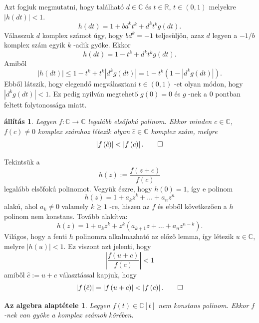 \documentclass[a4paper, showtrims]{memoir}
\makeatletter
\renewenvironment{proof}[1][\proofname]
    {\par\pushQED{\qed}%
    \normalfont \topsep6\p@\@plus6\p@\relax
    \trivlist
    \item[\hskip\labelsep
        \itshape
    #1\@addpunct{:}]\ignorespaces}
    {\popQED\endtrivlist\@endpefalse}
\theoremstyle{plain}
\newtheorem{proposition}{állítás}[chapter]
\newtheorem*{FA}{Az algebra alaptétele}
\theoremstyle{remark}
\theoremstyle{definition}
\makeatother
\begin{document}
\begin{proof}
	Azt fogjuk megmutatni, hogy található $d\in \mathbb{C}$ és $t\in
		\mathbb{R}$, $t\in \left( 0,1\right) $ melyekre $\left| h\left( dt\right)
		\right| <1.$\[
		h\left( dt\right) =1+bd^{k}t^{k}+d^{k}t^{k}g\left( dt\right) .
	\]
	Válasszuk $d$ komplex számot úgy, hogy $bd^{k}=-1$ teljesüljön, azaz $d$ legyen a $-1/b$ komplex szám egyik $k$ -adik gyöke.
	Ekkor
	\[
		h\left( dt\right) =1-t^{k}+d^{k}t^{k}g\left( dt\right) .
	\]
	Amiből
	\[
		\left| h\left( dt\right) \right| \leq 1-t^{k}+t^{k}\left| d^{k}g\left(
		dt\right) \right| =1-t^{k}\left( 1-\left| d^{k}g\left( dt\right) \right|
		\right) .
	\]
	Ebből látszik, hogy elegendő megválasztani $t\in \left(
		0,1\right) $ -et olyan módon, hogy $\left| d^{k}g\left( dt\right)
		\right| <1.$ Ez pedig nyilván megtehető $g\left( 0\right) =0$ és
	$g$ -nek a $0$ pontban feltett folytonossága miatt.
\end{proof}

\begin{proposition}
	\label{Th:Cauchy2}Legyen $f:\mathbb{C}\rightarrow \mathbb{C}$ legalább elsőfokú polinom.
	Ekkor minden $c\in \mathbb{C}$, $f\left( c\right) \neq 0$
	komplex számhoz létezik olyan $\hat{c}\in \mathbb{C}$ komplex szám,
	melyre
	\[
		\left| f\left( \hat{c}\right) \right| <\left| f\left( c\right) \right| .\qedhere
	\]
\end{proposition}

\begin{proof}
	Tekintsük a
	\[
		h\left( z\right) :=\frac{f\left( z+c\right) }{f\left( c\right) }
	\]
	legalább elsőfokú polinomot.
	Vegyük észre, hogy $h\left(
		0\right) =1$, így e polinom
	\[
		h\left( z\right) =1+a_{k}z^{k}+\ldots +a_{n}z^{n}
	\]
	alakú, ahol $a_{k}\neq 0$ valamely $k\geq 1$ -re, hiszen az $f$ és
	ebből következően a $h$ polinom nem konstans.
	Tovább alakítva:
	\[
		h\left( z\right) =1+a_{k}z^{k}+z^{k}\left( a_{k+1}z+\ldots
		+a_{n}z^{n-k}\right) .
	\]
	Világos, hogy a fenti $h$ polinomra alkalmazható az előző
	lemma, így létezik $u\in \mathbb{C}$, melyre $\left| h\left( u\right)
		\right| <1.$ Ez viszont azt jelenti, hogy
	\[
		\left| \frac{f\left( u+c\right) }{f\left( c\right) }\right| <1
	\]
	amiből $\hat{c}:=u+c$ választással kapjuk, hogy
	\[
		\left| f\left( \hat{c}\right) \right| =\left| f\left( u+c\right) \right|
		<\left| f\left( c\right) \right| .\qedhere
	\]
\end{proof}

\begin{FA}\label{Th:FundOfAlg}
	Legyen $f\left( t \right)\in\mathbb{C}[t]$ nem konstans polinom.
	Ekkor $f$-nek van gyöke a komplex számok körében.
\end{FA}
\end{document}
